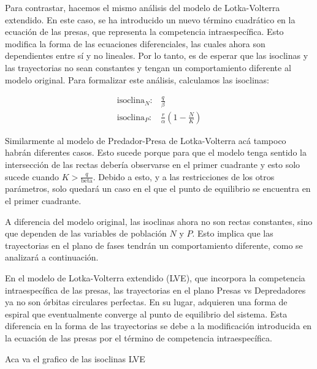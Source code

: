 \documentclass{article}
\begin{document}
\noindent Para contrastar, hacemos el mismo análisis del modelo de Lotka-Volterra extendido. En este caso, se ha introducido un nuevo término cuadrático en la ecuación de las presas, que representa la competencia intraespecífica. Esto modifica la forma de las ecuaciones diferenciales, las cuales ahora son dependientes entre sí y no lineales. Por lo tanto, es de esperar que las isoclinas y las trayectorias no sean constantes y tengan un comportamiento diferente al modelo original. Para formalizar este análisis, calculamos las isoclinas:

\begin{align*}
\text{isoclina}_{N}: &  \frac{q}{\beta} \\
\text{isoclina}_{P}: & \frac{r}{\alpha}\left(1 - \frac{N}{K}\right)
\end{align*}

\noindent Similarmente al modelo de Predador-Presa de Lotka-Volterra acá tampoco habrán diferentes casos. Esto sucede porque para que el modelo tenga sentido la intersección de las rectas debería observarse en el primer cuadrante y esto solo sucede cuando $K > \frac{q}{\text{beta}}$. Debido a esto, y a las restricciones de los otros parámetros, solo quedará un caso en el que el punto de equilibrio se encuentra en el primer cuadrante.  %

\vspace{1\baselineskip}
\noindent A diferencia del modelo original, las isoclinas ahora no son rectas constantes, sino que dependen de las variables de población $N$ y $P$. Esto implica que las trayectorias en el plano de fases tendrán un comportamiento diferente, como se analizará a continuación.

\vspace{1\baselineskip}

\noindent En el modelo de Lotka-Volterra extendido (LVE), que incorpora la competencia intraespecífica de las presas, las trayectorias en el plano Presas vs Depredadores ya no son órbitas circulares perfectas. En su lugar, adquieren una forma de espiral que eventualmente converge al punto de equilibrio del sistema. Esta diferencia en la forma de las trayectorias se debe a la modificación introducida en la ecuación de las presas por el término de competencia intraespecífica.
\vspace{1\baselineskip}

\vspace{10\baselineskip}
\noindent Aca va el grafico de las isoclinas LVE
\vspace{10\baselineskip}
\vspace{1\baselineskip}
\end{document}
